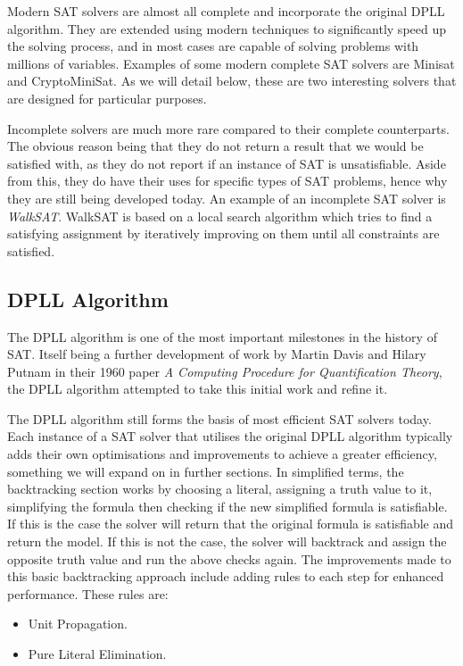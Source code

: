 \documentclass{article}
\begin{document}
Modern SAT solvers are almost all complete and incorporate the original DPLL algorithm. They are extended using modern techniques
to significantly speed up the solving process, and in most cases are capable of solving problems with millions of variables.
Examples of some modern complete SAT solvers are Minisat and CryptoMiniSat. As we will detail below, these are two interesting
solvers that are designed for particular purposes.

Incomplete solvers are much more rare compared to their complete counterparts. The obvious reason being that they do not return a
result that we would be satisfied with, as they do not report if an instance of SAT is unsatisfiable. Aside from this, they do 
have their uses for specific types of SAT problems, hence why they are still being developed today. An example of an incomplete 
SAT solver is \textit{WalkSAT}. WalkSAT is based on a local search algorithm which tries to find a satisfying assignment by 
iteratively improving on them until all constraints are satisfied.

\subsection{DPLL Algorithm}
The DPLL algorithm is one of the most important milestones in the history of SAT. Itself being a further development of work by 
Martin Davis and Hilary Putnam in their 1960 paper \textit{A Computing Procedure for Quantification Theory}\cite{putnam}, the 
DPLL algorithm attempted to take this initial work and refine it.

The DPLL algorithm still forms the basis of most efficient SAT solvers today. Each instance of a SAT solver that utilises the 
original DPLL algorithm typically adds their own optimisations and improvements to achieve a greater efficiency, something we 
will expand on in further sections. In simplified terms, the backtracking section works by choosing a literal, assigning a truth 
value to it, simplifying the formula then checking if the new simplified formula is satisfiable. If this is the case the solver 
will return that the original formula is satisfiable and return the model. If this is not the case, the solver will backtrack and 
assign the opposite truth value and run the above checks again. The improvements made to this basic backtracking approach include 
adding rules to each step for enhanced performance. These rules are:

\begin{itemize}
    \item Unit Propagation.
    \item Pure Literal Elimination.
\end{itemize}
\end{document}

